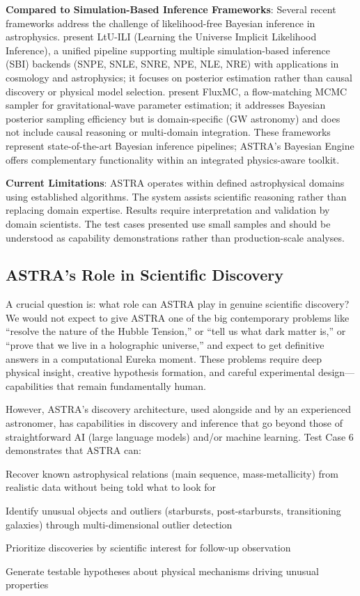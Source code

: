 \documentclass[usenatbib]{rasti}
\begin{document}
\textbf{Compared to Simulation-Based Inference Frameworks}: Several recent frameworks address the challenge of likelihood-free Bayesian inference in astrophysics. \citet{ho2024ltuili} present LtU-ILI (Learning the Universe Implicit Likelihood Inference), a unified pipeline supporting multiple simulation-based inference (SBI) backends (SNPE, SNLE, SNRE, NPE, NLE, NRE) with applications in cosmology and astrophysics; it focuses on posterior estimation rather than causal discovery or physical model selection. \citet{liang2026fluxmc} present FluxMC, a flow-matching MCMC sampler for gravitational-wave parameter estimation; it addresses Bayesian posterior sampling efficiency but is domain-specific (GW astronomy) and does not include causal reasoning or multi-domain integration. These frameworks represent state-of-the-art Bayesian inference pipelines; ASTRA's Bayesian Engine offers complementary functionality within an integrated physics-aware toolkit.

\textbf{Current Limitations}: ASTRA operates within defined astrophysical domains using established algorithms. The system assists scientific reasoning rather than replacing domain expertise. Results require interpretation and validation by domain scientists. The test cases presented use small samples and should be understood as capability demonstrations rather than production-scale analyses.

\subsection{ASTRA's Role in Scientific Discovery}

A crucial question is: what role can ASTRA play in genuine scientific discovery? We would not expect to give ASTRA one of the big contemporary problems like ``resolve the nature of the Hubble Tension,'' or ``tell us what dark matter is,'' or ``prove that we live in a holographic universe,'' and expect to get definitive answers in a computational Eureka moment. These problems require deep physical insight, creative hypothesis formation, and careful experimental design---capabilities that remain fundamentally human.

However, ASTRA's discovery architecture, used alongside and by an experienced astronomer, has capabilities in discovery and inference that go beyond those of straightforward AI (large language models) and/or machine learning. Test Case 6 demonstrates that ASTRA can:
\begin{description}
\item Recover known astrophysical relations (main sequence, mass-metallicity) from realistic data without being told what to look for
\item Identify unusual objects and outliers (starbursts, post-starbursts, transitioning galaxies) through multi-dimensional outlier detection
\item Prioritize discoveries by scientific interest for follow-up observation
\item Generate testable hypotheses about physical mechanisms driving unusual properties
\end{description}
\end{document}
